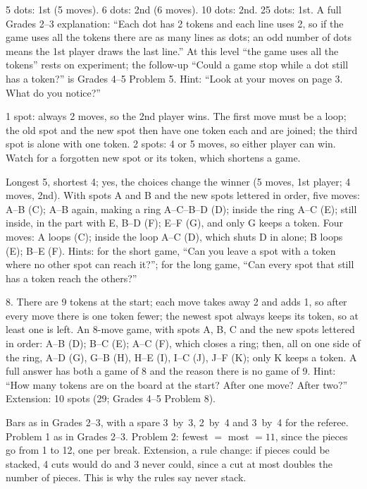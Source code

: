 5 dots: 1st (5 moves). 6 dots: 2nd (6 moves). 10 dots: 2nd. 25 dots: 1st. A full Grades 2--3 explanation: ``Each dot has 2 tokens and each line uses 2, so if the game uses all the tokens there are as many lines as dots; an odd number of dots means the 1st player draws the last line.'' At this level ``the game uses all the tokens'' rests on experiment; the follow-up ``Could a game stop while a dot still has a token?'' is Grades 4--5 Problem 5. Hint: ``Look at your moves on page 3. What do you notice?''

1 spot: always 2 moves, so the 2nd player wins. The first move must be a loop; the old spot and the new spot then have one token each and are joined; the third spot is alone with one token. 2 spots: 4 or 5 moves, so either player can win. Watch for a forgotten new spot or its token, which shortens a game.

Longest 5, shortest 4; yes, the choices change the winner (5 moves, 1st player; 4 moves, 2nd). With spots A and B and the new spots lettered in order, five moves: A--B (C); A--B again, making a ring A--C--B--D (D); inside the ring A--C (E); still inside, in the part with E, B--D (F); E--F (G), and only G keeps a token. Four moves: A loops (C); inside the loop A--C (D), which shuts D in alone; B loops (E); B--E (F). Hints: for the short game, ``Can you leave a spot with a token where no other spot can reach it?''; for the long game, ``Can every spot that still has a token reach the others?''

8. There are 9 tokens at the start; each move takes away 2 and adds 1, so after every move there is one token fewer; the newest spot always keeps its token, so at least one is left. An 8-move game, with spots A, B, C and the new spots lettered in order: A--B (D); B--C (E); A--C (F), which closes a ring; then, all on one side of the ring, A--D (G), G--B (H), H--E (I), I--C (J), J--F (K); only K keeps a token. A full answer has both a game of 8 and the reason there is no game of 9. Hint: ``How many tokens are on the board at the start? After one move? After two?'' Extension: 10 spots (29; Grades 4--5 Problem 8).

Bars as in Grades 2--3, with a spare 3~by~3, 2~by~4 and 3~by~4 for the referee. Problem 1 as in Grades 2--3. Problem 2: fewest $=$ most $=11$, since the pieces go from 1 to 12, one per break. Extension, a rule change: if pieces could be stacked, 4 cuts would do and 3 never could, since a cut at most doubles the number of pieces. This is why the rules say never stack.

